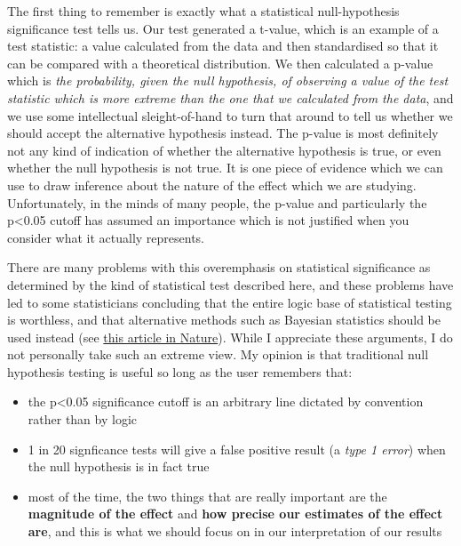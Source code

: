 \documentclass[
]{book}
\providecommand{\tightlist}{%
  \setlength{\itemsep}{0pt}\setlength{\parskip}{0pt}}
\begin{document}
The first thing to remember is exactly what a statistical null-hypothesis significance test tells us. Our test generated a t-value, which is an example of a test statistic: a value calculated from the data and then standardised so that it can be compared with a theoretical distribution. We then calculated a p-value which is \emph{the probability, given the null hypothesis, of observing a value of the test statistic which is more extreme than the one that we calculated from the data}, and we use some intellectual sleight-of-hand to turn that around to tell us whether we should accept the alternative hypothesis instead. The p-value is most definitely not any kind of indication of whether the alternative hypothesis is true, or even whether the null hypothesis is not true. It is one piece of evidence which we can use to draw inference about the nature of the effect which we are studying. Unfortunately, in the minds of many people, the p-value and particularly the p\textless0.05 cutoff has assumed an importance which is not justified when you consider what it actually represents.

There are many problems with this overemphasis on statistical significance as determined by the kind of statistical test described here, and these problems have led to some statisticians concluding that the entire logic base of statistical testing is worthless, and that alternative methods such as Bayesian statistics should be used instead (see \href{http://www.nature.com/news/scientific-method-statistical-errors-1.14700}{this article in Nature}). While I appreciate these arguments, I do not personally take such an extreme view. My opinion is that traditional null hypothesis testing is useful so long as the user remembers that:

\begin{itemize}
\tightlist
\item
  the p\textless0.05 significance cutoff is an arbitrary line dictated by convention rather than by logic
\item
  1 in 20 signficance tests will give a false positive result (a \emph{type 1 error}) when the null hypothesis is in fact true
\item
  most of the time, the two things that are really important are the \textbf{magnitude of the effect} and \textbf{how precise our estimates of the effect are}, and this is what we should focus on in our interpretation of our results
\end{itemize}
\end{document}
